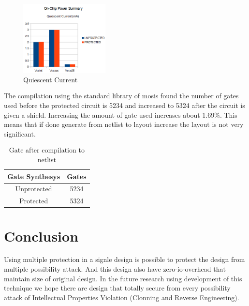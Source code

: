 \documentclass[10pt,journal,compsoc,letterpaper,final]{IEEEtran}
\begin{document}
\begin{figure}
	\centering
	\includegraphics[width=0.4\textwidth]
	{images/quiescent_current.png}
	\caption{Quiescent Current}
	\label{Quiescent Current}
\end{figure}

The compilation using the standard library of mosis found the number of gates used before the protected circuit is 5234 and increased to 5324 after the circuit is given a shield. Increasing the amount of gate used increases about 1.69\%. This means that if done generate from netlist to layout increase the layout is not very significant.

\begin{table}
	\centering
	\caption{Gate after compilation to netlist}
	\label{tab:gate}%
	\begin{tabular}{|c|c|}
		\hline
		\rowcolor[rgb]{ .906,  .902,  .902} Gate Synthesys & Gates \bigstrut\\
		\hline
		\rowcolor[rgb]{ .906,  .902,  .902} Unprotected & \cellcolor[rgb]{ 1,  1,  1} 5234 \bigstrut\\
		\hline
		\rowcolor[rgb]{ .906,  .902,  .902} Protected & \cellcolor[rgb]{ 1,  1,  1} 5324 \bigstrut\\
		\hline
	\end{tabular}%
\end{table}%

\section{Conclusion}
Using multiple protection in a signle design is possible to protect the design from multiple possibility attack. And this design also have zero-io-overhead that maintain size of original design. In the future research using development of this technique we hope there are design that totally secure from every possibility attack of Intellectual Properties Violation (Clonning and Reverse Engineering).
\end{document}
